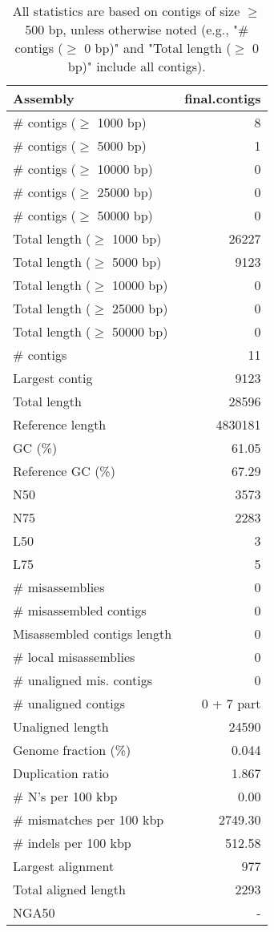 \documentclass[12pt,a4paper]{article}
\begin{document}
\begin{table}[ht]
\begin{center}
\caption{All statistics are based on contigs of size $\geq$ 500 bp, unless otherwise noted (e.g., "\# contigs ($\geq$ 0 bp)" and "Total length ($\geq$ 0 bp)" include all contigs).}
\begin{tabular}{|l*{1}{|r}|}
\hline
Assembly & final.contigs \\ \hline
\# contigs ($\geq$ 1000 bp) & 8 \\ \hline
\# contigs ($\geq$ 5000 bp) & 1 \\ \hline
\# contigs ($\geq$ 10000 bp) & 0 \\ \hline
\# contigs ($\geq$ 25000 bp) & 0 \\ \hline
\# contigs ($\geq$ 50000 bp) & 0 \\ \hline
Total length ($\geq$ 1000 bp) & 26227 \\ \hline
Total length ($\geq$ 5000 bp) & 9123 \\ \hline
Total length ($\geq$ 10000 bp) & 0 \\ \hline
Total length ($\geq$ 25000 bp) & 0 \\ \hline
Total length ($\geq$ 50000 bp) & 0 \\ \hline
\# contigs & 11 \\ \hline
Largest contig & 9123 \\ \hline
Total length & 28596 \\ \hline
Reference length & 4830181 \\ \hline
GC (\%) & 61.05 \\ \hline
Reference GC (\%) & 67.29 \\ \hline
N50 & 3573 \\ \hline
N75 & 2283 \\ \hline
L50 & 3 \\ \hline
L75 & 5 \\ \hline
\# misassemblies & 0 \\ \hline
\# misassembled contigs & 0 \\ \hline
Misassembled contigs length & 0 \\ \hline
\# local misassemblies & 0 \\ \hline
\# unaligned mis. contigs & 0 \\ \hline
\# unaligned contigs & 0 + 7 part \\ \hline
Unaligned length & 24590 \\ \hline
Genome fraction (\%) & 0.044 \\ \hline
Duplication ratio & 1.867 \\ \hline
\# N's per 100 kbp & 0.00 \\ \hline
\# mismatches per 100 kbp & 2749.30 \\ \hline
\# indels per 100 kbp & 512.58 \\ \hline
Largest alignment & 977 \\ \hline
Total aligned length & 2293 \\ \hline
NGA50 & - \\ \hline
\end{tabular}
\end{center}
\end{table}
\end{document}
